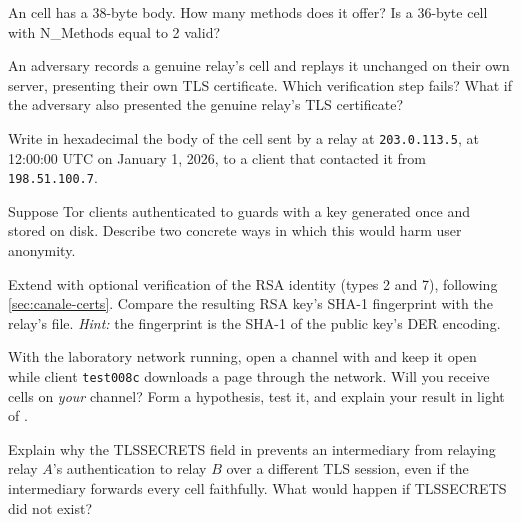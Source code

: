 \begin{esercizio}[1]\label{es:07-authchallenge}
An  cell has a 38-byte body. How many methods does it offer? Is a 36-byte cell with N\_Methods equal to 2 valid?
\end{esercizio}

\begin{esercizio}[2]\label{es:07-impostore}
An adversary records a genuine relay's  cell and replays it unchanged on their own server, presenting their own TLS certificate. Which verification step fails? What if the adversary also presented the genuine relay's TLS certificate?
\end{esercizio}

\begin{esercizio}[2]\label{es:07-netinfo}
Write in hexadecimal the body of the  cell sent by a relay at \texttt{203.0.113.5}, at 12:00:00 UTC on January 1, 2026, to a client that contacted it from \texttt{198.51.100.7}.
\end{esercizio}

\begin{esercizio}[2]\label{es:07-client-auth}
Suppose Tor clients authenticated to guards with a key generated once and stored on disk. Describe two concrete ways in which this would harm user anonymity.
\end{esercizio}

\begin{esercizio}[2]\label{es:07-rsa}
Extend  with optional verification of the RSA identity (types 2 and 7), following \cref{sec:canale-certs}. Compare the resulting RSA key's SHA-1 fingerprint with the relay's  file. \emph{Hint:} the fingerprint is the SHA-1 of the public key's DER encoding.
\end{esercizio}

\begin{esercizio}[3]\label{es:07-padding}
With the laboratory network running, open a channel with  and keep it open while client \texttt{test008c} downloads a page through the network. Will you receive  cells on \emph{your} channel? Form a hypothesis, test it, and explain your result in light of .
\end{esercizio}

\begin{esercizio}[3]\label{es:07-mitm}
Explain why the TLSSECRETS field in  prevents an intermediary from relaying relay $A$'s authentication to relay $B$ over a different TLS session, even if the intermediary forwards every cell faithfully. What would happen if TLSSECRETS did not exist?
\end{esercizio}

